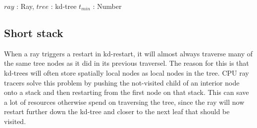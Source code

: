 \begin{algorithm}
  \caption{KD Restart}
  \label{alg:KDRestart}
  \begin{algorithmic}
              {$ray$ : Ray, $tree$ : kd-tree}
              {$t_{min}$ : Number}{
                    \ELSE
                    \ENDIF
                  \ENDWHILE
                  \ENDFOR
                  \ENDIF
                \ENDWHILE
              }
  \end{algorithmic}
\end{algorithm}

\subsection{Short stack}\label{sec:shortStack}


When a ray triggers a restart in kd-restart, it will almost always traverse many
of the same tree nodes as it did in its previous traversel. The reason for this
is that kd-trees will often store spatially local nodes as local nodes in the
tree. CPU ray tracers solve this problem by pushing the not-visited child of an
interior node onto a stack and then restarting from the first node on that
stack. This can save a lot of resources otherwise spend on traversing the tree,
since the ray will now restart further down the kd-tree and closer to the next
leaf that should be visited.

